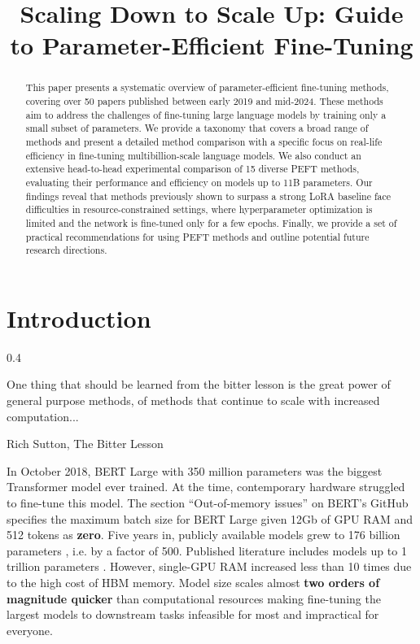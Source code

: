 \title{Scaling Down to Scale Up: Guide to Parameter-Efficient Fine-Tuning}

\begin{abstract}
This paper presents a systematic overview of parameter-efficient fine-tuning methods, covering over 50 papers published between early 2019 and mid-2024. These methods aim to address the challenges of fine-tuning large language models by training only a small subset of parameters. We provide a taxonomy that covers a broad range of methods and present a detailed method comparison with a specific focus on real-life efficiency in fine-tuning multibillion-scale language models. We also conduct an extensive head-to-head experimental comparison of 15 diverse PEFT methods, evaluating their performance and eﬀiciency on models up to 11B parameters. Our findings reveal that methods previously shown to surpass a strong LoRA baseline face diﬀiculties in resource-constrained settings, where hyperparameter optimization is limited and the network is fine-tuned only for a few epochs. Finally, we provide a set of practical recommendations for using PEFT methods and outline potential future research directions.
\end{abstract}

\section{Introduction}

\begin{floatingfigure}[r]{0.4\textwidth}
\epigraph{One thing that should be learned from the bitter lesson is the great power of general purpose methods, of methods that continue to scale with increased computation...}{Rich Sutton, The Bitter Lesson}

\end{floatingfigure}

In October 2018, BERT Large \citep{devlin2018bert} with 350 million parameters was the biggest Transformer model \citep{vaswani2017attention} ever trained. At the time, contemporary hardware struggled to fine-tune this model. The section ``Out-of-memory issues'' on BERT's GitHub\footnotemark{} specifies the maximum batch size for BERT Large given 12Gb of GPU RAM and 512 tokens as \textbf{zero}.
Five years in, publicly available models grew to 176 billion parameters \citep{bloom,zhang2022opt,zeng2022glm130b}, i.e. by a factor of 500. Published literature includes models up to 1 trillion parameters \citep{palm,megatron,switch}. However, single-GPU RAM increased less than 10 times due to the high cost of HBM memory. Model size scales almost \textbf{two orders of magnitude quicker} than computational resources making fine-tuning the largest models to downstream tasks infeasible for most and impractical for everyone.

